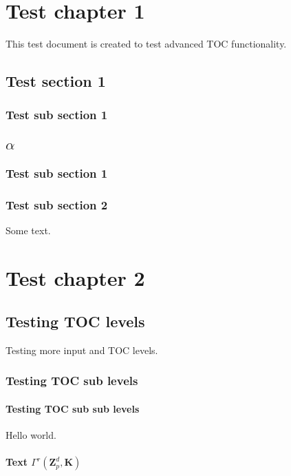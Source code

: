 \chapter{Test chapter 1}
This test document is created to test advanced TOC functionality.

\section{Test section 1}

\subsection{Test sub section 1}

\section{$\alpha$}

\subsection{Test sub section 1}

\subsection{Test sub section 2}
Some text.

\chapter{Test chapter 2}

\section{Testing TOC levels}
Testing more input and TOC levels.

\subsection{Testing TOC sub levels}

\subsubsection{Testing TOC sub sub levels}
Hello world.

\subsubsection{Text $\Gamma^{r}(\ensuremath{{\mathbf{Z}}}_p^d,\mathbf{K})$}

